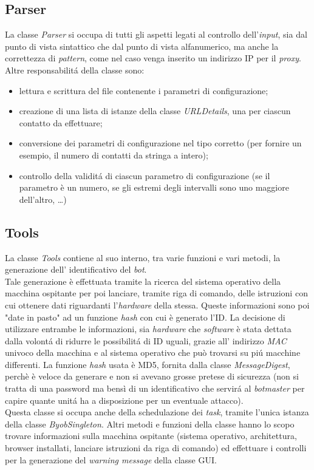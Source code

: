 \vspace*{0.5cm}
\subsection{Parser}
La classe \textit{Parser} si occupa di tutti gli aspetti legati al controllo dell'\textit{input}, sia dal punto di vista sintattico che dal punto di vista alfanumerico, ma anche la correttezza di \textit{pattern}, come nel caso venga inserito un indirizzo IP per il \textit{proxy}. Altre responsabilit\'a della classe sono:
\begin{itemize}
\item lettura e scrittura del file contenente i parametri di configurazione;
\item creazione di una lista di istanze della classe \textit{URLDetails}, una per ciascun contatto da effettuare;
\item conversione dei parametri di configurazione nel tipo corretto (per fornire un esempio, il numero di contatti da stringa a intero);
\item controllo della validit\'a di ciascun parametro di configurazione (se il parametro \`e un numero, se gli estremi degli intervalli sono uno maggiore dell'altro, \dots )
\end{itemize}

\vspace*{0.5cm}
\subsection{Tools}
La classe \textit{Tools} contiene al suo interno, tra varie funzioni e vari metodi, la generazione dell' identificativo del \textit{bot}.\\
Tale generazione \`e effettuata tramite la ricerca del sistema operativo della macchina ospitante per poi lanciare, tramite riga di comando, delle istruzioni con cui ottenere dati riguardanti l'\textit{hardware} della stessa. Queste informazioni  sono poi "date in pasto" ad un funzione \textit{hash} con cui \`e generato l'ID. La decisione di utilizzare entrambe le informazioni, sia \textit{hardware} che \textit{software} \`e stata dettata dalla volont\'a di ridurre le possibilit\'a di ID uguali, grazie all' indirizzo \textit{MAC} univoco della macchina e al sistema operativo che pu\`o trovarsi su pi\'u macchine differenti.
La funzione \textit{hash} usata \`e MD5, fornita dalla classe \textit{MessageDigest}, perch\`e \`e veloce da generare e non si avevano grosse pretese di sicurezza (non si tratta di una password ma bens\`i di un identificativo che servir\'a al \textit{botmaster} per capire quante unit\'a ha a disposizione per un eventuale attacco).\\
Questa classe si occupa anche della schedulazione dei \textit{task}, tramite l'unica istanza della classe \textit{ByobSingleton}.
Altri metodi e funzioni della classe hanno lo scopo trovare informazioni sulla macchina ospitante (sistema operativo, architettura, browser installati, lanciare istruzioni da riga di comando) ed effettuare i controlli per la generazione del \textit{warning message} della classe GUI.

